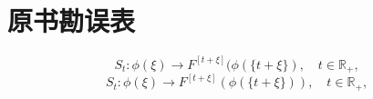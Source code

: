 \chapter{原书勘误表}
	\errOrig $$S_{t}:\phi(\xi)\to F^{[t+\xi]}(\phi(\{t+\xi\}),\quad t\in\mathbb{R}_{+},$$
	\errCorr $$S_{t}:\phi(\xi)\to F^{[t+\xi]}(\phi(\{t+\xi\})),\quad t\in\mathbb{R}_{+},$$	

